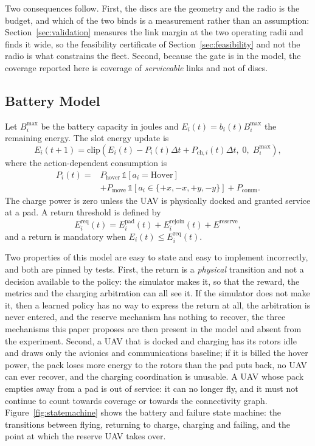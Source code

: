 \documentclass[conference]{IEEEtran}
\begin{document}
Two consequences follow. First, the discs are the geometry and the radio is the budget, and which of the two binds is a measurement rather than an assumption: Section~\ref{sec:validation} measures the link margin at the two operating radii and finds it wide, so the feasibility certificate of Section~\ref{sec:feasibility} and not the radio is what constrains the fleet. Second, because the gate is in the model, the coverage reported here is coverage of \emph{serviceable} links and not of discs.

\subsection{Battery Model}
Let $B_i^{\max}$ be the battery capacity in joules and $E_i(t)=b_i(t)B_i^{\max}$ the remaining energy. The slot energy update is
\begin{equation}
E_i(t+1)=\mathrm{clip}\!\left(E_i(t)-P_i(t)\Delta t+P_{\mathrm{ch},i}(t)\Delta t,\;0,\;B_i^{\max}\right),
\label{eq:battery}
\end{equation}
where the action-dependent consumption is
\begin{equation}
\begin{split}
P_i(t)={}&P_{\mathrm{hover}}\,\mathbb 1[a_i=\mathrm{Hover}]\\
&+P_{\mathrm{move}}\,\mathbb 1[a_i\in\{+x,-x,+y,-y\}]+P_{\mathrm{comm}}.
\end{split}
\label{eq:power}
\end{equation}
The charge power is zero unless the UAV is physically docked and granted service at a pad. A return threshold is defined by
\begin{equation}
E_i^{\mathrm{req}}(t)=E_i^{\mathrm{pad}}(t)+E_i^{\mathrm{rejoin}}(t)+E^{\mathrm{reserve}},
\label{eq:ereq}
\end{equation}
and a return is mandatory when $E_i(t)\le E_i^{\mathrm{req}}(t)$.

Two properties of this model are easy to state and easy to implement incorrectly, and both are pinned by tests. First, the return is a \emph{physical} transition and not a decision available to the policy: the simulator makes it, so that the reward, the metrics and the charging arbitration can all see it. If the simulator does not make it, then a learned policy has no way to express the return at all, the arbitration is never entered, and the reserve mechanism has nothing to recover, the three mechanisms this paper proposes are then present in the model and absent from the experiment. Second, a UAV that is docked and charging has its rotors idle and draws only the avionics and communications baseline; if it is billed the hover power, the pack loses more energy to the rotors than the pad puts back, no UAV can ever recover, and the charging coordination is unusable. A UAV whose pack empties away from a pad is out of service: it can no longer fly, and it must not continue to count towards coverage or towards the connectivity graph. Figure~\ref{fig:statemachine} shows the battery and failure state machine: the transitions between flying, returning to charge, charging and failing, and the point at which the reserve UAV takes over.
\end{document}
